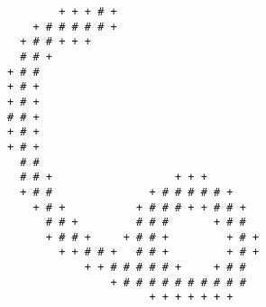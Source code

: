 \begin{multicols*}{2}
\begin{Verbatim}[samepage=true]
                                                        
                                                        
\end{Verbatim}
\begin{Verbatim}[samepage=true]
                                                        
                    + + + # +                           
                + # # # # # +                           
              + # # + + +                               
              # # +                                     
            + # #                                       
            + # +                                       
            + # +                                       
            # # +                                       
            + # +                                       
            + # +                                       
              # #                                       
              # # +                   + + +             
              + # #               + # # # # # +         
                + # +           + # # # + + # # +       
                  # # +         # # #       + # #       
                  + # # +     + # # +         + # +     
                    + + # # +   # # +         + # +     
                        + + # # # # # +     + # #       
                            + # # # # # # # # # #       
                                  + + + + + + +         
                                                        
                                                        
                                                        
\end{Verbatim}
\begin{Verbatim}[samepage=true]
                                                        
                                                        
                                                        

\end{Verbatim}
\end{multicols*}
